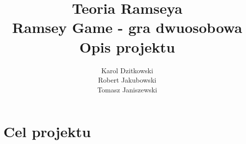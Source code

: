 \documentclass[11pt,a4paper]{article}
\author{
	Karol Dzitkowski\\
	Robert Jakubowski\\
	Tomasz Janiszewski
}
\title{
	Teoria Ramseya\\
	\huge{Ramsey Game - gra dwuosobowa}\\
	Opis projektu
 }
\begin{document}
\maketitle
\newpage

\tableofcontents
\newpage

\section{Cel projektu}
\end{document}

